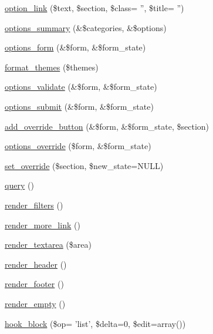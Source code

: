 \begin{CompactItemize}
\item 
\hyperlink{classviews__plugin__display_56c8b43b4f8605d40c23b7e573a185e0}{option\_\-link} (\$text, \$section, \$class= '', \$title= '')
\item 
\hyperlink{classviews__plugin__display_7a2f2aeedfc14816815e3ce65a61aedf}{options\_\-summary} (\&\$categories, \&\$options)
\item 
\hyperlink{classviews__plugin__display_d9c69d91ea1165ff51dcd1f1f6d3a154}{options\_\-form} (\&\$form, \&\$form\_\-state)
\item 
\hyperlink{classviews__plugin__display_4f8fbb2ff9dd0f00e31a265334d840e0}{format\_\-themes} (\$themes)
\item 
\hyperlink{classviews__plugin__display_0b4336df4db25dec552de8d20141a9f5}{options\_\-validate} (\&\$form, \&\$form\_\-state)
\item 
\hyperlink{classviews__plugin__display_75f0b2d5587b365640fcb4d414daae36}{options\_\-submit} (\&\$form, \&\$form\_\-state)
\item 
\hyperlink{classviews__plugin__display_60dd36bfcf55cb6248f572688c2474b8}{add\_\-override\_\-button} (\&\$form, \&\$form\_\-state, \$section)
\item 
\hyperlink{classviews__plugin__display_6628fc7addb8376633ff63889e37256e}{options\_\-override} (\$form, \&\$form\_\-state)
\item 
\hyperlink{classviews__plugin__display_06eae6326562b974ee8c3c8106a1c130}{set\_\-override} (\$section, \$new\_\-state=NULL)
\item 
\hyperlink{classviews__plugin__display_efdc473b5cbe1c7eb4d0f5175d02184a}{query} ()
\item 
\hyperlink{classviews__plugin__display_9bdc16c7066a51729cedb9235bc15e6f}{render\_\-filters} ()
\item 
\hyperlink{classviews__plugin__display_d680ce0ae6e6ed738ab9018f34e05703}{render\_\-more\_\-link} ()
\item 
\hyperlink{classviews__plugin__display_7f1219c7f3910d1310e5f1beae1a1aa6}{render\_\-textarea} (\$area)
\item 
\hyperlink{classviews__plugin__display_3c0302020ed6b1e8d6a0be40760533d6}{render\_\-header} ()
\item 
\hyperlink{classviews__plugin__display_4b2a49cfccca396da8206e95fddadc0a}{render\_\-footer} ()
\item 
\hyperlink{classviews__plugin__display_80f1ef182222a316f4ca38ba1b4e1aa9}{render\_\-empty} ()
\item 
\hyperlink{classviews__plugin__display_15bc6f2b36a1018456fbec532aaa9e05}{hook\_\-block} (\$op= 'list', \$delta=0, \$edit=array())

\end{CompactItemize}
